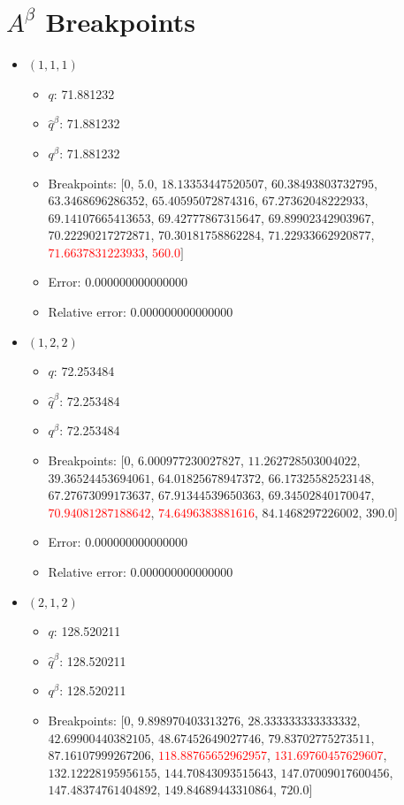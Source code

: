\documentclass{article}%
\begin{document}
\section{$A^\beta$ Breakpoints}%
\thispagestyle{plain}%
\begin{itemize}%
	\item $(1, 1, 1)$%
	\begin{itemize}%
		\item $q$: 71.881232%
		\item $\hat{q}^\beta$: 71.881232%
		\item $q^\beta$: 71.881232%
		\item Breakpoints: $[$$0$, $5.0$, $18.13353447520507$, $60.38493803732795$, $63.3468696286352$, $65.40595072874316$, $67.27362048222933$, $69.14107665413653$, $69.42777867315647$, $69.89902342903967$, $70.22290217272871$, $70.30181758862284$, $71.22933662920877$, \textcolor{red}{$71.6637831223933$}, \textcolor{red}{$560.0$}$]$%
		\item Error: 0.000000000000000%
		\item Relative error: 0.000000000000000%
	\end{itemize}%
	\item $(1, 2, 2)$%
	\begin{itemize}%
		\item $q$: 72.253484%
		\item $\hat{q}^\beta$: 72.253484%
		\item $q^\beta$: 72.253484%
		\item Breakpoints: $[$$0$, $6.000977230027827$, $11.262728503004022$, $39.36524453694061$, $64.01825678947372$, $66.17325582523148$, $67.27673099173637$, $67.91344539650363$, $69.34502840170047$, \textcolor{red}{$70.94081287188642$}, \textcolor{red}{$74.6496383881616$}, $84.1468297226002$, $390.0$$]$%
		\item Error: 0.000000000000000%
		\item Relative error: 0.000000000000000%
	\end{itemize}%
	\item $(2, 1, 2)$%
	\begin{itemize}%
		\item $q$: 128.520211%
		\item $\hat{q}^\beta$: 128.520211%
		\item $q^\beta$: 128.520211%
		\item Breakpoints: $[$$0$, $9.898970403313276$, $28.333333333333332$, $42.69900440382105$, $48.67452649027746$, $79.83702775273511$, $87.16107999267206$, \textcolor{red}{$118.88765652962957$}, \textcolor{red}{$131.69760457629607$}, $132.12228195956155$, $144.70843093515643$, $147.07009017600456$, $147.48374761404892$, $149.84689443310864$, $720.0$$]$%

\end{itemize}
\end{itemize}
\end{document}
